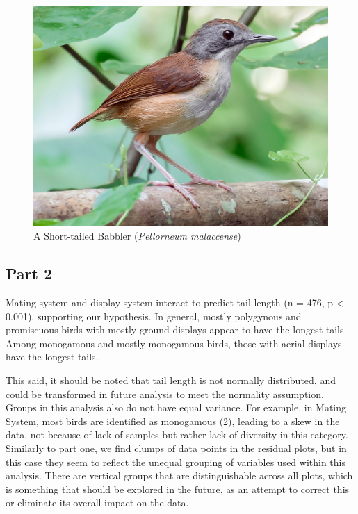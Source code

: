 \documentclass[
  12pt,
]{article}
\begin{document}
\begin{figure}
\centering
\includegraphics{Images/short-tailed_babbler.jpeg}
\caption{A Short-tailed Babbler (\emph{Pellorneum malaccense})}
\end{figure}

\newpage

\hypertarget{part-2}{%
\subsection{Part 2}\label{part-2}}

Mating system and display system interact to predict tail length (n =
476, p \textless{} 0.001), supporting our hypothesis. In general, mostly
polygynous and promiscuous birds with mostly ground displays appear to
have the longest tails. Among monogamous and mostly monogamous birds,
those with aerial displays have the longest tails.

This said, it should be noted that tail length is not normally
distributed, and could be transformed in future analysis to meet the
normality assumption. Groups in this analysis also do not have equal
variance. For example, in Mating System, most birds are identified as
monogamous (2), leading to a skew in the data, not because of lack of
samples but rather lack of diversity in this category. Similarly to part
one, we find clumps of data points in the residual plots, but in this
case they seem to reflect the unequal grouping of variables used within
this analysis. There are vertical groups that are distinguishable across
all plots, which is something that should be explored in the future, as
an attempt to correct this or eliminate its overall impact on the data.
\end{document}
